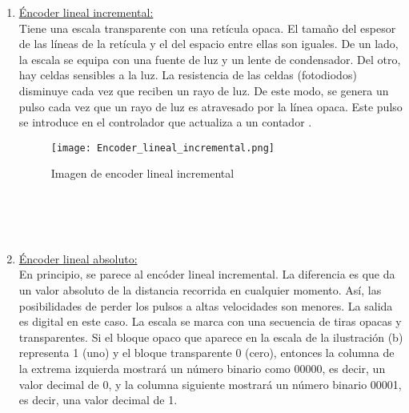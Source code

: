 \begin{enumerate}
\begin{enumerate}
\begin{enumerate}
			\begin{enumerate}
				\item \underline{Éncoder lineal incremental:} \\
				Tiene una
				escala transparente con una retícula opaca. El tamaño del espesor de las líneas de la retícula y el del espacio entre ellas son iguales. De un lado, la escala se equipa con una fuente de luz y un lente de condensador. Del otro, hay celdas sensibles a la luz. La resistencia de las celdas (fotodiodos) disminuye cada vez que reciben un rayo de luz. De este modo, se genera un pulso cada vez que un rayo de luz es atravesado por la línea opaca. Este pulso se introduce en el controlador que actualiza a un contador \cite{saha2010robotics}.
				\\
		\begin{figure}[h]
	\centering
		\texttt{[image: Encoder\_lineal\_incremental.png]}%
		\label{fig:Encoder_lineal_incremental}
		\cite{saha2010robotics}
	\caption{Imagen de encoder lineal incremental}
	\hfill
\end{figure}				
\\
\\
\\
				\item \underline{Éncoder lineal absoluto:} \\
				En principio, se parece al encóder lineal incremental.  La diferencia es que da un valor absoluto de la distancia recorrida en cualquier momento. Así,
				las posibilidades de perder los pulsos a altas velocidades son menores. La salida es digital
				en este caso. La escala se marca con una secuencia de tiras opacas y transparentes. Si el bloque opaco que aparece en la escala de la ilustración (b)  representa 1 (uno) y el bloque transparente 0 (cero), entonces la columna de la extrema izquierda mostrará un número binario como 00000, es decir, un valor decimal de 0, y la columna siguiente mostrará un número binario 00001, es decir, una valor decimal de 1.\cite{saha2010robotics}
				
				\begin{figure}[h]
					\centering
					\hfill
\end{figure}
\end{enumerate}
\end{enumerate}
\end{enumerate}
\end{enumerate}
